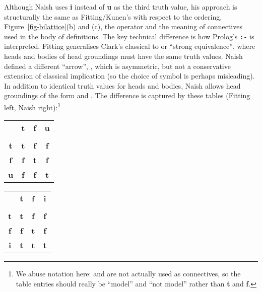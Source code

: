 \documentclass{tlp}
\begin{document}
Although Naish uses \textbf{i} instead of \textbf{u} as the third truth
value, his approach is structurally the same as Fitting/Kunen's with
respect to the ordering, Figure~\ref{fig-bilattice}(b) and (c), the
 operator and the meaning of connectives used in
the body of definitions.  The key technical
difference is how Prolog's \texttt{:-}
is interpreted.  Fitting generalises Clark's classical 
to  or ``strong equivalence'', where heads and bodies of head
groundings must have the same truth values.
Naish defined a different ``arrow'', ,
which is asymmetric, but not a conservative extension of classical
implication (so the choice of symbol is perhaps misleading).
In addition to identical truth values for heads and
bodies, Naish allows head groundings of the form 
and .
The difference is captured by these tables (Fitting left, Naish
right):\footnote{We abuse notation here:  and  are not
actually used as connectives, so the table entries should really be ``model''
and ``not model'' rather than \textbf{t} and \textbf{f}.}
\smallskip

\begin{center}
\begin{minipage}{0.48\textwidth}
\begin{tabular}{|c||c|c|c|}
\cline{1-4}
 & \textbf{t}  & \textbf{f} & \textbf{u} \\
\cline{1-4}
\vspace{-3.9mm} & & & \\
\cline{1-4}
\textbf{t}   & \textbf{t}  & \textbf{f} & \textbf{f} \\
\cline{1-4}
\textbf{f}   & \textbf{f}  & \textbf{t} & \textbf{f} \\
\cline{1-4}
\textbf{u}   & \textbf{f}  & \textbf{f} & \textbf{t} \\
\cline{1-4}
\end{tabular}
\end{minipage}
\begin{minipage}{0.48\textwidth}
\begin{tabular}{|c||c|c|c|}
\cline{1-4}
 & \textbf{t}  & \textbf{f} & \textbf{i} \\
\cline{1-4}
\vspace{-3.9mm} & & & \\
\cline{1-4}
\textbf{t}   & \textbf{t}  & \textbf{f} & \textbf{f} \\
\cline{1-4}
\textbf{f}   & \textbf{f}  & \textbf{t} & \textbf{f} \\
\cline{1-4}
\textbf{i}   & \textbf{t}  & \textbf{t} & \textbf{t} \\
\cline{1-4}
\end{tabular}
\end{minipage}
\end{center}
\end{document}
